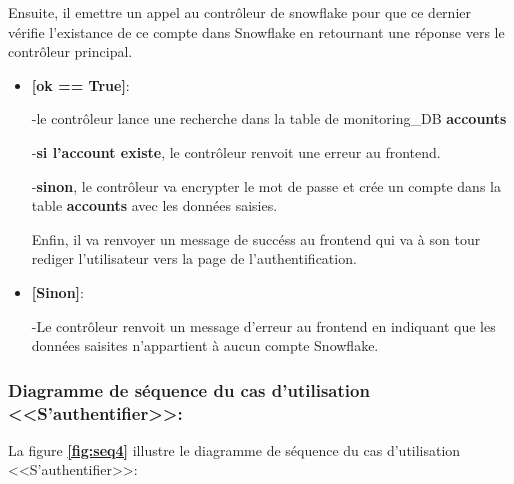     \par Ensuite, il emettre un appel au contrôleur de snowflake pour que ce dernier vérifie l'existance de ce compte dans Snowflake en retournant une réponse vers le contrôleur principal. 
    \begin{itemize}
        \item \textbf{[ok == True]}:
       \par -le contrôleur lance une recherche dans la table de monitoring\_DB \textbf{accounts}
       \par -\textbf{si l'account existe}, le contrôleur renvoit une erreur au frontend.
       \par -\textbf{sinon}, le contrôleur va encrypter le mot de passe et crée un compte dans la table \textbf{accounts} avec les données saisies.
       \par Enfin, il va renvoyer un message de succéss au frontend qui va à son tour rediger l'utilisateur vers la page de l'authentification. 
       \item \textbf{[Sinon]}: 
       \par -Le contrôleur renvoit un message d'erreur au frontend en indiquant que les données saisites n'appartient à aucun compte Snowflake.
    \end{itemize}
    \subsubsection{Diagramme de séquence du cas d'utilisation <<S'authentifier>>:}
    \par La figure \textbf{\ref*{fig:seq4}} illustre le diagramme de séquence du cas d'utilisation <<S'authentifier>>:

